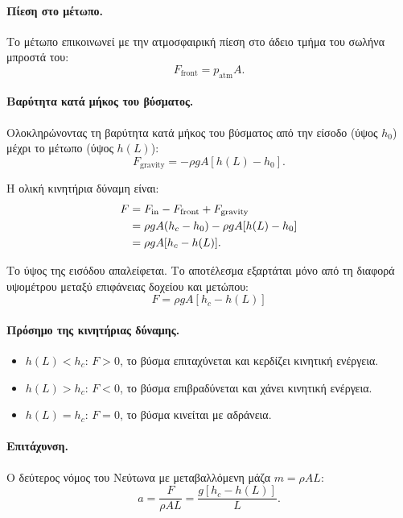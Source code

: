 \documentclass[11pt]{article}
\begin{document}
\paragraph{Πίεση στο μέτωπο.} Το μέτωπο επικοινωνεί με την ατμοσφαιρική πίεση στο άδειο τμήμα του σωλήνα μπροστά του:
\[
  F_{\text{front}} = p_{\text{atm}} A.
\]

\paragraph{Βαρύτητα κατά μήκος του βύσματος.} Ολοκληρώνοντας τη βαρύτητα κατά μήκος του βύσματος από την είσοδο (ύψος $h_0$) μέχρι το μέτωπο (ύψος $h(L)$):
\[
  F_{\text{gravity}} = -\rho g A [h(L) - h_0].
\]

Η ολική κινητήρια δύναμη είναι:
\begin{align}
  F &= F_{\text{in}} - F_{\text{front}} + F_{\text{gravity}} \notag \\
     &= \rho g A (h_c - h_0) - \rho g A [h(L) - h_0] \notag \\
     &= \rho g A [h_c - h(L)].
  \label{eq:driving-force}
\end{align}

Το ύψος της εισόδου απαλείφεται. Το αποτέλεσμα εξαρτάται μόνο από τη διαφορά υψομέτρου μεταξύ επιφάνειας δοχείου και μετώπου:
\begin{equation}
  \boxed{F = \rho g A [h_c - h(L)]}
  \label{eq:driving-force-boxed}
\end{equation}

\paragraph{Πρόσημο της κινητήριας δύναμης.}
\begin{itemize}[nosep,leftmargin=2em]
  \item $h(L) < h_c$: $F > 0$, το βύσμα επιταχύνεται και κερδίζει κινητική ενέργεια.
  \item $h(L) > h_c$: $F < 0$, το βύσμα επιβραδύνεται και χάνει κινητική ενέργεια.
  \item $h(L) = h_c$: $F = 0$, το βύσμα κινείται με αδράνεια.
\end{itemize}

\paragraph{Επιτάχυνση.} Ο δεύτερος νόμος του Νεύτωνα με μεταβαλλόμενη μάζα $m = \rho A L$:
\begin{equation}
  a = \frac{F}{\rho A L} = \frac{g[h_c - h(L)]}{L}.
  \label{eq:acceleration}
\end{equation}
\end{document}
